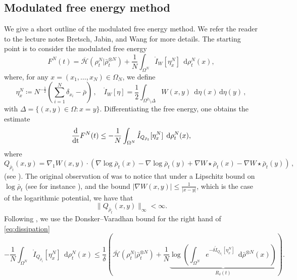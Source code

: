\documentclass[a4paper,10pt,twoside]{amsart}
\newcommand{\dx}[1]{\,\mathrm{d}#1}  %
\theoremstyle{remark}
\theoremstyle{definition}
\numberwithin{equation}{section}
\newcommand{\0}{{\bf 0}}
\newcommand{\+}{\hspace{-.5ex}+\hspace{-.5ex}}
\begin{document}
 \subsection{Modulated free energy method}
We give a short outline of the  modulated free energy method. We refer the reader to the lecture notes Bretsch, Jabin, and Wang \cite{BJW19a} for more details. The starting point is to consider the modulated free energy
\begin{equation}\label{eq:modulatedenergy}
F^N(t)=\overline{\mathcal{H}}(\rho^N_t|\bar\rho^{\otimes N}_t)+\frac{1}{N}\int_{\Omega^N}\mathring{I}_W[\eta^N_x]\;\dx \rho^N_t(x),
\end{equation}
where, for any $x=(x_1,\dots,x_N)\in \Omega_N$, we define
\begin{equation}
  \eta^N_x \coloneqq N^{-\frac12}\left(\sum_{i=1}^N \delta_{x_i}-\bar\rho\right) \, , \quad \mathring{I}_W[\eta]=\frac{1}{2}\int_{\Omega^2\setminus \Delta} W(x,y)\;\dx\eta(x)\dx\eta(y)\, ,
  \label{eq:fluctuation}
\end{equation}
with $\Delta=\{(x,y)\in \Omega:x=y\}$.
Differentiating the free energy, one obtains the estimate
\begin{equation}\label{eq:dissipation}
  \frac{\rm d}{\rm dt}F^N(t)\le -\frac{1}{N} \int_{\Omega^N}\mathring{I}_{Q_{\bar\rho_t}}[\eta^N_x]\;\dx \rho^N_t(x),
\end{equation}
where 
$$
Q_{\bar\rho_t}(x,y)=\nabla_1 W(x,y)\cdot \left(\nabla\log\bar\rho_t(x)-\nabla\log\bar\rho_t(y)+\nabla W\star \bar{\rho}_t(x)-\nabla W\star \bar{\rho}_t(y)\right)\, ,
$$
(see \cite[Equation 2.6]{BJW19a}). The original observation of \cite{Jabin2016} was to notice that under a Lipschitz bound on $\log\bar\rho_t$ (see for instance \cite[Theorem 3.1]{cai2024propagation}), and the bound $|\nabla W(x,y)|\le \frac{1}{|x-y|}$, which is the case of the logarithmic potential, we have that 
\begin{equation}\label{eq:Qbound}
\|Q_{\bar\rho_t}(x,y)\|_\infty<\infty.
\end{equation}
Following \cite{Jabin2016}, we use the Donsker--Varadhan bound for the right hand of \eqref{eq:dissipation}
\begin{equation}\label{eq:inequality}
  -\frac{1}{N} \int_{\Omega^N}\mathring{I}_{Q_{\bar\rho_t}}[\eta^N_x]\;\dx \rho^N_t(x)\le \frac{1}{\delta}\left(\overline{\mathcal{H}}(\rho^N_t|\bar\rho^{\otimes N}_t) +\frac{1}{N}\underbrace{\log \left(\int_{\Omega^N} e^{-\delta \mathring{I}_{Q_{\bar\rho_t}}[\eta^N_x]} \;\dx\bar\rho^{\otimes N}(x)\right)}_{R_\delta(t)}\right).
\end{equation}
\end{document}
